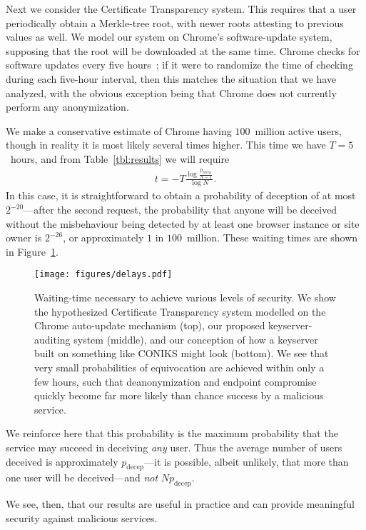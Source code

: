 \documentclass[USenglish]{llncs}
\begin{document}
Next we consider the Certificate Transparency system.  This requires
that a user periodically obtain a Merkle-tree root, with newer roots
attesting to previous values as well.  We model our system on
Chrome's software-update system, supposing that the root will be
downloaded at the same time.  Chrome checks for software
updates every five hours~\cite{google-chrome-updates}; if it were
to randomize the time of checking during each five-hour interval,
then this matches the situation that we have analyzed, with the
obvious exception being that Chrome does not currently perform any
anonymization.

We make a conservative estimate of Chrome having
$100$~million active users, though in reality it is most likely
several times higher.  This time we have $T = 5$~hours,
and from Table~\ref{tbl:results} we will require
\begin{align*}
	t = - T \frac{\log \frac{p_\text{decep}}{N-1}}{\log N} .
\end{align*}
In this case, it is straightforward to obtain a probability of
deception of at most $2^{-20}$---after the second request,
the probability that anyone will be deceived without
the misbehaviour being detected by at least one browser
instance or site owner is $2^{-26}$, or approximately
$1$ in $100$~million.  These waiting times are shown in
Figure~\ref{fig:delays}.
\begin{figure}[h]
	\centering
	\texttt{[image: figures/delays.pdf]}
	\caption{Waiting-time necessary to achieve various
			levels of security.  We show the hypothesized
			Certificate Transparency system modelled on
			the Chrome auto-update mechanism (top),
			our proposed keyserver-auditing system (middle),
			and our conception of how a keyserver
			built on something like CONIKS might look (bottom).
			We see that very small probabilities of equivocation
			are achieved within only a few hours, such that
			deanonymization and endpoint compromise quickly
			become far more likely than chance success by
			a malicious service.}
	\label{fig:delays}
\end{figure}

We reinforce here that this probability is the
maximum probability that the service may succeed
in deceiving \emph{any} user.  Thus the average number
of users deceived is approximately $p_\text{decep}$---it is
possible, albeit unlikely, that more than one user will be deceived---and
\emph{not}
$N p_\text{decep}$.

We see, then, that our results are useful in practice and can
provide meaningful security against malicious services.
\end{document}
